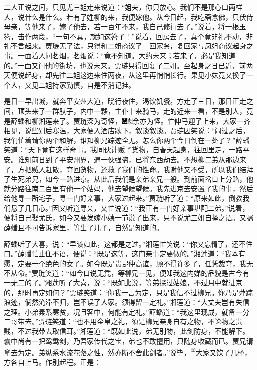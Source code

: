 二人正说之间，只见尤三姐走来说道：``姐夫，你只放心。我们不是那心口两样人，说什么是什么。若有了姓柳的来，我便嫁他。从今日起，我吃斋念佛，只伏侍母亲，等他来了，嫁了他去，若一百年不来，我自己修行去了。''说着，将一根玉簪，击作两段，``一句不真，就如这簪子！''说着，回房去了，真个竟非礼不动，非礼不言起来。贾琏无了法，只得和二姐商议了一回家务，复回家与凤姐商议起身之事。一面着人问茗烟，茗烟说：``竟不知道。大约未来；若来了，必是我知道的。''一面又问他的街坊，也说未来。贾琏只得回复了二姐。至起身之日已近，前两天便说起身，却先往二姐这边来住两夜，从这里再悄悄长行。果见小妹竟又换了一个人，又见二姐持家勤慎，自是不消记挂。

是日一早出城，就奔平安州大道，晓行夜住，渴饮饥餐。方走了三日，那日正走之间，顶头来了一群驮子，内中一夥，主仆十来骑马，走的近来一看，不是别人，竟是薛蟠和柳湘莲来了。贾琏深为奇怪，{\includegraphics[width=3mm]{../Images/00003}\includegraphics[width=3mm]{../Images/00012}\footnotesize \kaishu 余亦为怪。}忙伸马迎了上来，大家一齐相见，说些别后寒温，大家便入酒店歇下，叙谈叙谈。贾琏因笑说：``闹过之后，我们忙着请你两个和解，谁知柳兄踪迹全无。怎么你两个今日倒在一处了？''薛蟠笑道：``天下竟有这样奇事。我同伙计贩了货物，自春天起身，往回里走，一路平安。谁知前日到了平安州界，遇一伙强盗，已将东西劫去。不想柳二弟从那边来了，方把贼人赶散，夺回货物，还救了我们的性命。我谢他又不受，所以我们结拜了生死弟兄，如今一路进京。从此后我们是亲弟亲兄一般。到前面岔口上分路，他就分路往南二百里有他一个姑妈，他去望候望候。我先进京去安置了我的事，然后给他寻一所宅子，寻一门好亲事，大家过起来。''贾琏听了道：``原来如此，倒教我们悬了几日心。''因又听道寻亲，又忙说道：``我正有一门好亲事堪配二弟。''说着，便将自己娶尤氏，如今又要发嫁小姨一节说了出来，只不说尤三姐自择之语。又嘱薛蟠且不可告诉家里，等生了儿子，自然是知道的。

薛蟠听了大喜，说：``早该如此，这都是之过。''湘莲忙笑说：``你又忘情了，还不住口。''薛蟠忙止住不语，便说：``既是这等，这门亲事定要做的。''湘莲道：``我本有愿，定要一个绝色的女子。如今既是贵昆仲高谊，顾不得许多了，任凭裁夺，我无不从命。''贾琏笑道：``如今口说无凭，等柳兄一见，便知我这内娣的品貌是古今有一无二的了。''湘莲听了大喜，说：``既如此说，等弟探过姑娘，不过月中就进京的，那时再定如何？''贾琏笑道：``你我一言为定，只是我信不过柳兄。你乃是萍踪浪迹，倘然淹滞不归，岂不误了人家。须得留一定礼。''湘莲道：``大丈夫岂有失信之理。小弟素系寒贫，况且客中，何能有定礼。''薛蟠道：``我这里现成，就备一分二哥带去。''贾琏笑道：``也不用金帛之礼，须是柳兄亲身自有之物，不论物之贵贱，不过我带去取信耳。''湘莲道：``既如此说，弟无别物，此剑防身，不能解下。囊中尚有一把鸳鸯剑，乃吾家传代之宝，弟也不敢擅用，只随身收藏而已。贾兄请拿去为定。弟纵系水流花落之性，然亦断不舍此剑者。''说毕，\href{../Text/part0070_split_000.html\#lnkback_1_a}{\textsuperscript{①}}大家又饮了几杯，方各自上马。作别起程。正是：

